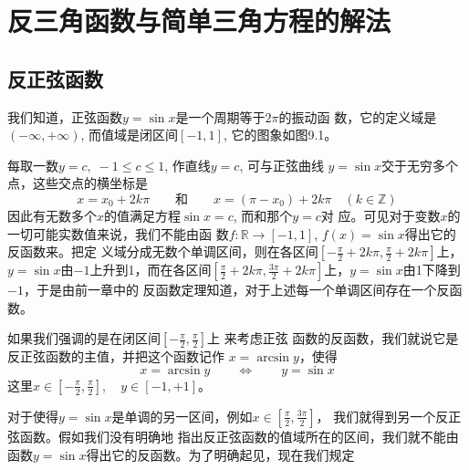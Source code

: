 \chapter{反三角函数与简单三角方程的解法}
\section{反正弦函数}
我们知道，正弦函数$y=\sin x$是一个周期等于$2\pi$的振动函
数，它的定义域是$(-\infty,+\infty)$, 而值域是闭区间$[-1,1]$, 它的图象如图9.1。

\begin{figure}[htp]
    \centering
{}
    \caption{}
\end{figure}


每取一数$y=c,\; -1\le c\le 1$, 作直线$y=c$, 可与正弦曲线
$y=\sin x$交于无穷多个点，这些交点的横坐标是
\[x=x_0+2k\pi\qquad \text{和}\qquad x=(π-x_0)+2k\pi\quad (k\in\mathbb{Z})\]
因此有无数多个$x$的值满足方程$\sin x =c$, 而和那个$y=c$对
应。可见对于变数$x$的一切可能实数值来说，我们不能由函
数$f:\mathbb{R}\to [-1,1]$, $f(x)=\sin x$得出它的反函数来。把定
义域分成无数个单调区间，则在各区间$\left[-\frac{\pi}{2}+2k\pi, \frac{\pi}{2}+2k\pi\right]$上，$y=\sin x$由$-1$上升到1，而在各区间$\left[\frac{\pi}{2}+2k\pi, \frac{3\pi}{2}+2k\pi\right]$上，$y=\sin x$由1下降到$-1$，于是由前一章中的
反函数定理知道，对于上述每一个单调区间存在一个反函数。

如果我们强调的是在闭区间$\left[-\frac{\pi}{2},\frac{\pi}{2}\right]$上
来考虑正弦
函数的反函数，我们就说它是反正弦函数的主值，并把这个函数记作
$x=\arcsin y$，使得
$$x=\arcsin y\qquad \Longleftrightarrow \qquad y=\sin x$$
这里$x\in \left[-\frac{\pi}{2},\frac{\pi}{2}\right],\quad y\in[-1,+1]$。

对于使得$y=\sin x$是单调的另一区间，例如$x\in \left[\frac{\pi}{2},\frac{3\pi}{2}\right]$，
我们就得到另一个反正弦函数。假如我们没有明确地
指出反正弦函数的值域所在的区间，我们就不能由函数$y=\sin x$得出它的反函数。为了明确起见，现在我们规定

